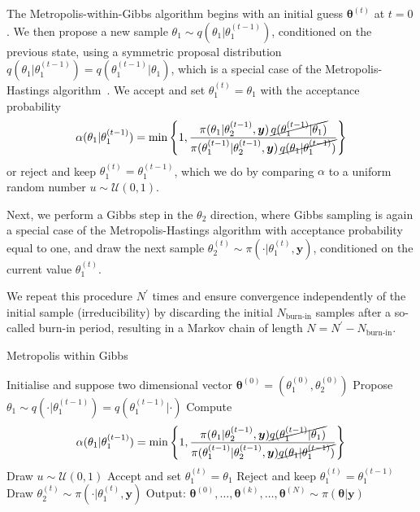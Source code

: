 The Metropolis-within-Gibbs algorithm begins with an initial guess $\bm{\theta}^{(t)}$ at $t=0$. We then propose a new sample $\theta_1 \sim q(\theta_1 |  \theta_1^{(t-1)})$, conditioned on the previous state, using a symmetric proposal distribution $q(\theta_1 |  \theta_1^{(t-1)}) = q(\theta_1^{(t-1)} |  \theta_1)$, which is a special case of the Metropolis-Hastings algorithm~\cite{roberts2006harris}.
We accept and set $\theta_1^{(t)} = \theta_1$ with the acceptance probability
\begin{align}
	\alpha(\theta_1 |  \theta_1^{(t-1)}) = \min \left\{ 1, \frac{\pi(\theta_1 |  \theta_2^{(t-1)}, \bm{y}) \, \cancel{q(\theta_1^{(t-1)} |  \theta_1)}}{\pi(\theta_1^{(t-1)} |  \theta_2^{(t-1)}, \bm{y}) \, \cancel{q(\theta_1 |  \theta_1^{(t-1)})}} \right\}
\end{align}
or reject and keep $\theta_1^{(t)} = \theta_1^{(t-1)}$, which we do by comparing $\alpha$ to a uniform random number $u \sim \mathcal{U}(0,1)$. 

Next, we perform a Gibbs step in the $\theta_2$ direction, where Gibbs sampling is again a special case of the Metropolis-Hastings algorithm with acceptance probability equal to one, and draw the next sample $\theta_2^{(t)} \sim \pi(\cdot |  \theta_1^{(t)}, \bm{y})$, conditioned on the current value $\theta_1^{(t)}$. 

We repeat this procedure $N^{\prime}$ times and ensure convergence independently of the initial sample (irreducibility) by discarding the initial $N_{\text{burn-in}}$ samples after a so-called burn-in period, resulting in a Markov chain of length $N = N^{\prime} - N_{\text{burn-in}}$.

\begin{algorithm}[!ht]
	\caption{Metropolis within Gibbs}
	\begin{algorithmic}[1]
		\STATE Initialise and suppose two dimensional vector \( \bm{\theta}^{(0)}  =( \theta_1^{(0)} , \theta_2^{(0)}  ) \)
		\STATE Propose \( \theta_1 \sim q(\cdot   | \theta_1 ^{(t-1)}) = q(\theta_1 ^{(t-1)} |\cdot  ) \)
		\STATE Compute
		\[ \alpha( \theta_1  | \theta_1^{(t-1)}) = \min \left\{ 1, \frac{\pi(\theta_1  | \theta^{(t-1)}_2, \bm{y}) \cancel{q(\theta_1^{(t-1)} | \theta_1 ) } }{\pi(\theta_1^{(t-1)}| \theta_2^{(t-1)}, \bm{y}) \cancel{q(\theta_1 | \theta_1^{(t-1)})} } \right\} \]
		\STATE Draw $u \sim \mathcal{U}(0,1)$
		\STATE Accept and set \( \theta_1^{(t)} = \theta_1 \)
		\ELSE  
		\STATE Reject and keep \(\theta_1^{(t)} = \theta_1^{(t-1)} \)
		\ENDIF
		\STATE Draw \(\theta_2^{(t)} \sim  \pi( \cdot | \theta_1^{(t)} , \bm{y} )\) 
		\ENDFOR
		\STATE Output: $ \bm{\theta}^{(0)}, \dots,  \bm{\theta}^{(k)} , \dots,   \bm{\theta}^{(N)} \sim \pi(\bm{\theta}| \bm{y}) $
	\end{algorithmic}
	\label{alg:MwG}
\end{algorithm}


